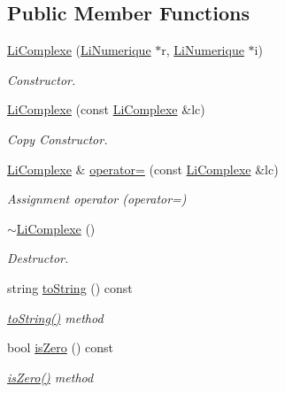 \subsection*{Public Member Functions}
\begin{DoxyCompactItemize}
\item 
\hyperlink{class_li_complexe_a0681209fab64a65ed4da984218b3abfd}{Li\+Complexe} (\hyperlink{class_li_numerique}{Li\+Numerique} $\ast$r, \hyperlink{class_li_numerique}{Li\+Numerique} $\ast$i)
\begin{DoxyCompactList}\small\item\em Constructor. \end{DoxyCompactList}\item 
\hyperlink{class_li_complexe_a7acf3c859eca3cf2a8e6d81c05aa49d4}{Li\+Complexe} (const \hyperlink{class_li_complexe}{Li\+Complexe} \&lc)
\begin{DoxyCompactList}\small\item\em Copy Constructor. \end{DoxyCompactList}\item 
\hyperlink{class_li_complexe}{Li\+Complexe} \& \hyperlink{class_li_complexe_a5183c5901d1582f325b7f02f1b4f0198}{operator=} (const \hyperlink{class_li_complexe}{Li\+Complexe} \&lc)
\begin{DoxyCompactList}\small\item\em Assignment operator (operator=) \end{DoxyCompactList}\item 
\hyperlink{class_li_complexe_a56e0f48b9815525913fcf136e51ac39d}{$\sim$\+Li\+Complexe} ()
\begin{DoxyCompactList}\small\item\em Destructor. \end{DoxyCompactList}\item 
string \hyperlink{class_li_complexe_a5490d27f24fd273c8a3f5cc28e22d6d8}{to\+String} () const 
\begin{DoxyCompactList}\small\item\em \hyperlink{class_li_complexe_a5490d27f24fd273c8a3f5cc28e22d6d8}{to\+String()} method \end{DoxyCompactList}\item 
bool \hyperlink{class_li_complexe_a6bcabbf5bcf296fdb048c9be278f175a}{is\+Zero} () const 
\begin{DoxyCompactList}\small\item\em \hyperlink{class_li_complexe_a6bcabbf5bcf296fdb048c9be278f175a}{is\+Zero()} method \end{DoxyCompactList}\item 

\end{DoxyCompactItemize}
